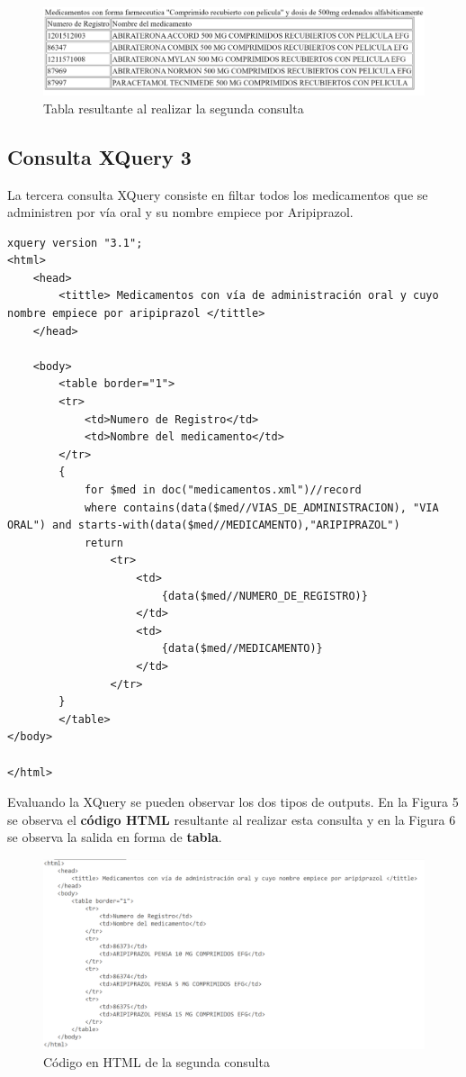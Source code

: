 \documentclass[../main.tex]{subfiles}
\begin{document}
\begin{figure}[h]
    \centering
    \includegraphics[scale=0.25]{images/xquery_2_output.png}
    \caption{Tabla resultante al realizar la segunda consulta}
    \label{fig:mesh1}
\end{figure}


\subsection{Consulta XQuery 3}
La tercera consulta XQuery consiste en filtar todos los medicamentos que se administren por vía oral y su nombre empiece por Aripiprazol.

\begin{lstlisting}
xquery version "3.1";
<html>
    <head>
        <tittle> Medicamentos con vía de administración oral y cuyo nombre empiece por aripiprazol </tittle>
    </head>
    
    <body>
        <table border="1">
        <tr>
            <td>Numero de Registro</td>
            <td>Nombre del medicamento</td>
        </tr>
        {
            for $med in doc("medicamentos.xml")//record
            where contains(data($med//VIAS_DE_ADMINISTRACION), "VIA ORAL") and starts-with(data($med//MEDICAMENTO),"ARIPIPRAZOL")
            return 
                <tr> 
                    <td> 
                        {data($med//NUMERO_DE_REGISTRO)}
                    </td>
                    <td>
                        {data($med//MEDICAMENTO)}
                    </td>
                </tr>
        }
        </table>
</body>

</html>

\end{lstlisting}

Evaluando la XQuery se pueden observar los dos tipos de outputs. En la Figura 5 se observa el \textbf{código HTML} resultante al realizar esta consulta y en la Figura 6 se observa la salida en forma de \textbf{tabla}.


\begin{figure}[h]
    \centering
    \includegraphics[scale=0.3]{images/xquery_3_html.png}
    \caption{Código en HTML de la segunda consulta}
    \label{fig:mesh1}
\end{figure}
\end{document}
